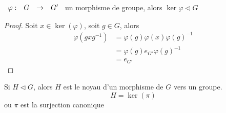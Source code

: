 \documentclass[]{report}
\begin{document}
\begin{prop}{}{}
    $\begin{array}{ccccc} \varphi : & G & \to & G' \end{array}$ un morphisme de groupe, alors $\ker \varphi \triangleleft G$
\end{prop}

\begin{proof}
    Soit $x\in \ker (\varphi)$, soit $g\in G$, alors
    \begin{align*}
        \varphi (g x g^{-1})&=\varphi(g)\varphi(x)\varphi(g)^{-1}\\
        &=\varphi (g) e_{G'} \varphi(g)^{-1}\\
        &=e_{G'}
    \end{align*}
\end{proof}

\begin{prop}{}{}
    Si $H\triangleleft G$, alors $H$ est le noyau d'un morphisme de $G$ vers un groupe.
    \[H=\ker (\pi)\]
    ou $\pi$ est la surjection canonique
\end{prop}
\end{document}
